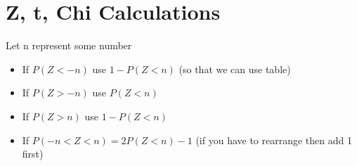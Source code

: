 \documentclass[12pt]{article}
\begin{document}
\section{Z, t, Chi Calculations}
Let n represent some number
\begin{itemize}
\item If $P(Z<-n)$ use $1-P(Z<n)$ (so that we can use table)
\item If $P(Z>-n)$ use $P(Z<n)$
\item If $P(Z>n)$ use $1 - P(Z<n)$
\item If $P(-n<Z<n)=2P(Z<n)-1$ (if you have to rearrange then add 1 first)
\end{itemize}

\end{document}
